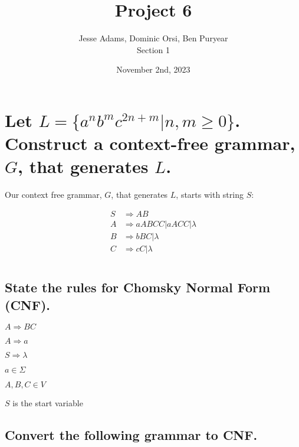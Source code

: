 \documentclass{article}
\title{Project 6}
\author{Jesse Adams, Dominic Orsi, Ben Puryear\\Section 1}
\date{November 2nd, 2023}
\begin{document}
\maketitle

\section{ Let $L = \{a^n b^m c^{2n+m} | n, m \ge 0\}$.  Construct a context-free grammar, $G$, that generates $L$.}

Our context free grammar, $G$, that generates $L$, starts with string $S$:

\begin{align*}
    S & \Rightarrow A B                           \\
    A & \Rightarrow a A B C C | a A C C | \lambda \\
    B & \Rightarrow b B C | \lambda               \\
    C & \Rightarrow c C | \lambda
\end{align*}

\pagebreak

\section{}

\subsection{State the rules for Chomsky Normal Form (CNF).}

\begin{list}{}{A CFG is in CNF if every rule is of the form:}
    \item $A \Rightarrow BC$
    \item $A \Rightarrow a$
    \item $S \Rightarrow \lambda$
\end{list}

\begin{list}{}{Where:}
    \item $a \in \Sigma$
    \item $A, B, C \in V$
    \item $S$ is the start variable
\end{list}

\subsection{Convert the following grammar to CNF.}
\end{document}
